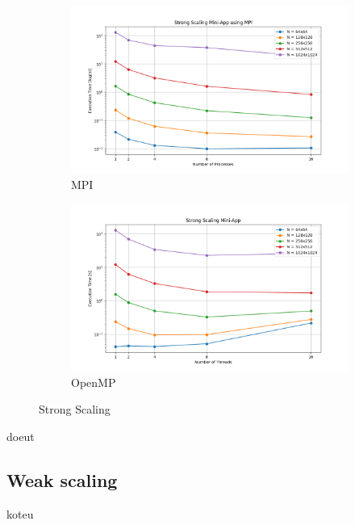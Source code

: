 \begin{figure}[H]
	\centering
	\begin{subfigure}{0.8\textwidth}
		\includegraphics[width=\textwidth]{./media/strong_scaling.png}
		\caption{MPI}
		\label{fig:mpi-strong}
	\end{subfigure}
	\begin{subfigure}{0.8\textwidth}
		\includegraphics[width=\textwidth]{./media/strong_scaling_omp.png}
		\caption{OpenMP}
		\label{fig:openmp-strong}
	\end{subfigure}
	\caption{Strong Scaling}
	\label{fig:strong_scaling}
\end{figure}
doeut
\subsection{Weak scaling}
koteu


